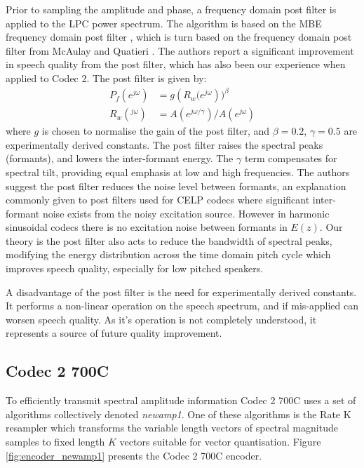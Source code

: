 \documentclass{article}
\begin{document}
Prior to sampling the amplitude and phase, a frequency domain post filter is applied to the LPC power spectrum. The algorithm is based on the MBE frequency domain post filter \cite[Section 8.6, p 267]{kondoz1994digital}, which is turn based on the frequency domain post filter from McAulay and Quatieri \cite[Section 4.3, p 148]{kleijn1995speech}.  The authors report a significant improvement in speech quality from the post filter, which has also been our experience when applied to Codec 2. The post filter is given by:
\begin{equation}
\label{eq:lpc_lsp_pf}
\begin{split}
P_f(e^{j\omega}) &= g \left( R_w(e^{j \omega} \right))^\beta \\
R_w(^{j\omega}) &= A(e^{j \omega/ \gamma})/A(e^{j \omega})
\end{split}
\end{equation}
where $g$ is chosen to normalise the gain of the post filter, and $\beta=0.2$, $\gamma=0.5$ are experimentally derived constants.  The post filter raises the spectral peaks (formants), and lowers the inter-formant energy.  The $\gamma$ term compensates for spectral tilt, providing equal emphasis at low and high frequencies.  The authors suggest the post filter reduces the noise level between formants, an explanation commonly given to post filters used for CELP codecs where significant inter-formant noise exists from the noisy excitation source.  However in harmonic sinusoidal codecs there is no excitation noise between formants in $E(z)$.  Our theory is the post filter also acts to reduce the bandwidth of spectral peaks, modifying the energy distribution across the time domain pitch cycle which improves speech quality, especially for low pitched speakers.

A disadvantage of the post filter is the need for experimentally derived constants.  It performs a non-linear operation on the speech spectrum, and if mis-applied can worsen speech quality.  As it's operation is not completely understood, it represents a source of future quality improvement.

\subsection{Codec 2 700C}
\label{sect:mode_newamp1}

To efficiently transmit spectral amplitude information Codec 2 700C uses a set of algorithms collectively denoted \emph{newamp1}.  One of these algorithms is the Rate K resampler which transforms the variable length vectors of spectral magnitude samples to fixed length $K$ vectors suitable for vector quantisation. Figure \ref{fig:encoder_newamp1} presents the Codec 2 700C encoder.  
\end{document}

